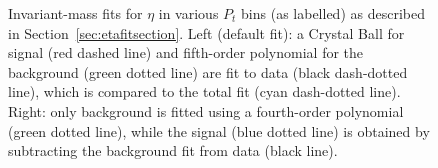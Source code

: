 \begin{figure}[H]
\ContinuedFloat*
 \centering
\label{fig:etaptfit}
\caption[Invariant-mass fits for $\eta$ in various $P_{t}$ bins]{Invariant-mass fits for $\eta$ in various $P_{t}$ bins (as labelled) as described in Section~\ref{sec:etafitsection}. Left (default fit):  a Crystal Ball for signal (red dashed line) and fifth-order polynomial for the background (green dotted line) are fit to data (black dash-dotted line), which is compared to the total fit  (cyan dash-dotted line). Right: only background is fitted using a fourth-order polynomial (green dotted line), while the signal (blue dotted line) is obtained by subtracting the background fit from data (black line).}
\end{figure}
